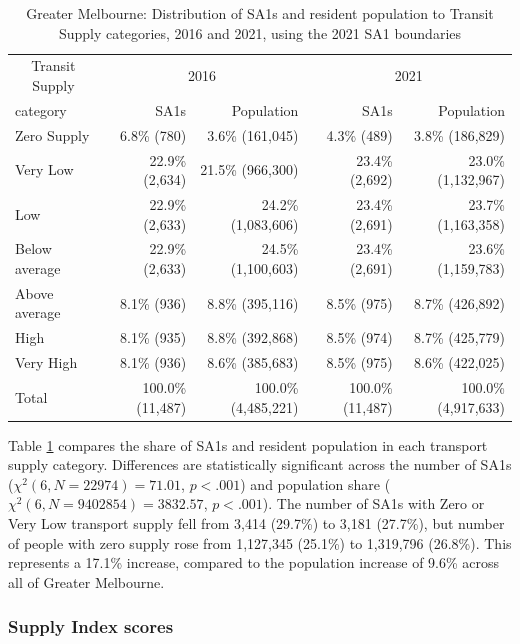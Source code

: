 \documentclass[preprint, 3p,
authoryear]{elsarticle} %
\begin{document}
\begin{table}

\caption{\label{tab:Greater_Melbourne_SA1_2016_2021_table_and_bar_chart}Greater Melbourne: Distribution of SA1s and resident population to Transit Supply categories, 2016 and 2021, using the 2021 SA1 boundaries}
\centering
\begin{tabular}[t]{l|r|r|r|r}
\hline
\multicolumn{1}{c|}{Transit Supply} & \multicolumn{2}{c|}{2016} & \multicolumn{2}{c}{2021} \\
\cline{1-1} \cline{2-3} \cline{4-5}
category & SA1s & Population & SA1s & Population\\
\hline
Zero Supply & 6.8\%    (780) & 3.6\%   (161,045) & 4.3\%    (489) & 3.8\%   (186,829)\\
\hline
Very Low & 22.9\%  (2,634) & 21.5\%   (966,300) & 23.4\%  (2,692) & 23.0\% (1,132,967)\\
\hline
Low & 22.9\%  (2,633) & 24.2\% (1,083,606) & 23.4\%  (2,691) & 23.7\% (1,163,358)\\
\hline
Below average & 22.9\%  (2,633) & 24.5\% (1,100,603) & 23.4\%  (2,691) & 23.6\% (1,159,783)\\
\hline
Above average & 8.1\%    (936) & 8.8\%   (395,116) & 8.5\%    (975) & 8.7\%   (426,892)\\
\hline
High & 8.1\%    (935) & 8.8\%   (392,868) & 8.5\%    (974) & 8.7\%   (425,779)\\
\hline
Very High & 8.1\%    (936) & 8.6\%   (385,683) & 8.5\%    (975) & 8.6\%   (422,025)\\
\hline
Total & 100.0\% (11,487) & 100.0\% (4,485,221) & 100.0\% (11,487) & 100.0\% (4,917,633)\\
\hline
\end{tabular}
\end{table}

Table \ref{tab:Greater_Melbourne_SA1_2016_2021_table_and_bar_chart}
compares the share of SA1s and resident population in each transport
supply category. Differences are statistically significant across the
number of SA1s (\(\chi^2(6, N = 22974) = 71.01\), \(p < .001\)) and
population share (\(\chi^2(6, N = 9402854) = 3832.57\), \(p < .001\)).
The number of SA1s with Zero or Very Low transport supply fell from
3,414 (29.7\%) to 3,181 (27.7\%), but number of people with zero supply
rose from 1,127,345 (25.1\%) to 1,319,796 (26.8\%). This represents a
17.1\% increase, compared to the population increase of 9.6\% across all
of Greater Melbourne.

\subsubsection{Supply Index scores}\label{supply-index-scores-1}
\end{document}
